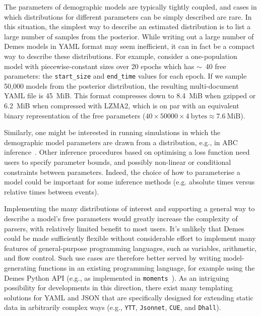 \documentclass[11pt]{article}
\newcommand{\moments}[0]{\texttt{moments}}
\newcommand{\ggcomment}[1]{{\textcolor{yellow!60!red}{GG: #1}}}
\begin{document}
The parameters of
demographic models are typically tightly coupled, and cases in which
distributions for different parameters can be simply described are rare.
In this situation, the simplest way to describe an estimated
distribution is to list a large number of samples from
the posterior. While writing out a large number of Demes models in
YAML format may seem inefficient, it can in fact be a compact
way to describe these distributions.
For example, consider a one-population model with piecewise-constant sizes over
20 epochs which has $\sim$~40 free parameters: the \texttt{start\_size} and
\texttt{end\_time} values for each epoch. If we sample 50,000 models
from the posterior distribution, the resulting multi-document YAML file is
45~MiB.
This format compresses down to 8.4~MiB when gzipped or 6.2~MiB
when compressed with LZMA2, which is on par with an equivalent binary
representation of the free parameters
($40\times50000\times4~\text{bytes} \approx 7.6~\text{MiB}$).

Similarly, one might be interested in running simulations in which
the demographic model parameters are drawn from a distribution, e.g.,
in ABC inference~\citep{beaumont2002approximate}.
Other inference procedures based on optimising a loss function
\citep{gutenkunst2009inferring,kamm2017efficient,jouganous2017inferring,ragsdale2019models,excoffier2021fastsimcoal2}
need users to specify parameter bounds,
and possibly non-linear or conditional constraints between parameters.
Indeed, the choice of how to parameterise a model could be important for
some inference methods (e.g. absolute times versus relative times between events).

Implementing the many distributions of interest and supporting a general
way to describe a model's free parameters would greatly increase the
complexity of parsers, with relatively limited benefit to most users.
It's unlikely that Demes could be made sufficiently
flexible without considerable effort to implement many features of
general-purpose programming languages, such as variables, arithmetic,
and flow control.
Such use cases are therefore better served by writing model-generating
functions in an existing programming language, for example
using the Demes Python API (e.g., as implemented in \moments\
\citep{jouganous2017inferring,ragsdale2019models}).
As an intriguing possibility for developments in this direction,
there exist many templating solutions for YAML and JSON that are
specifically designed for extending static data in arbitrarily complex ways
(e.g., \texttt{YTT}, \texttt{Jsonnet}, \texttt{CUE}, and \texttt{Dhall}).
\end{document}

